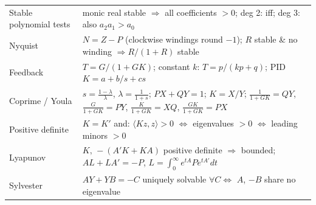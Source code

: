 \begin{center}
\begin{tabular}{@{}p{4.3cm}p{11cm}@{}}
Stable polynomial tests & monic real stable $\Rightarrow$ all coefficients $>0$; deg 2: iff; deg 3: also $a_2a_1>a_0$\\
Nyquist & $N=Z-P$ (clockwise windings round $-1$); $R$ stable \& no winding $\Rightarrow R/(1+R)$ stable\\
Feedback & $T=G/(1+GK)$; constant $k$: $T=p/(kp+q)$; PID $K=a+b/s+cs$\\
Coprime / Youla & $s=\frac{1-\lambda}\lambda$, $\lambda=\frac1{1+s}$; $PX+QY=1$; $K=X/Y$; $\frac1{1+GK}=QY$, $\frac{G}{1+GK}=PY$, $\frac{K}{1+GK}=XQ$, $\frac{GK}{1+GK}=PX$\\
Positive definite & $K=K'$ and: $\langle Kz,z\rangle>0$ $\iff$ eigenvalues $>0$ $\iff$ leading minors $>0$\\
Lyapunov & $K,\,-(A'K+KA)$ positive definite $\Rightarrow$ bounded; $AL+LA'=-P$, $L=\int_0^\infty e^{tA}Pe^{tA'}dt$\\
Sylvester & $AY+YB=-C$ uniquely solvable $\forall C\iff$ $A$, $-B$ share no eigenvalue\\
\bottomrule
\end{tabular}
\end{center}
